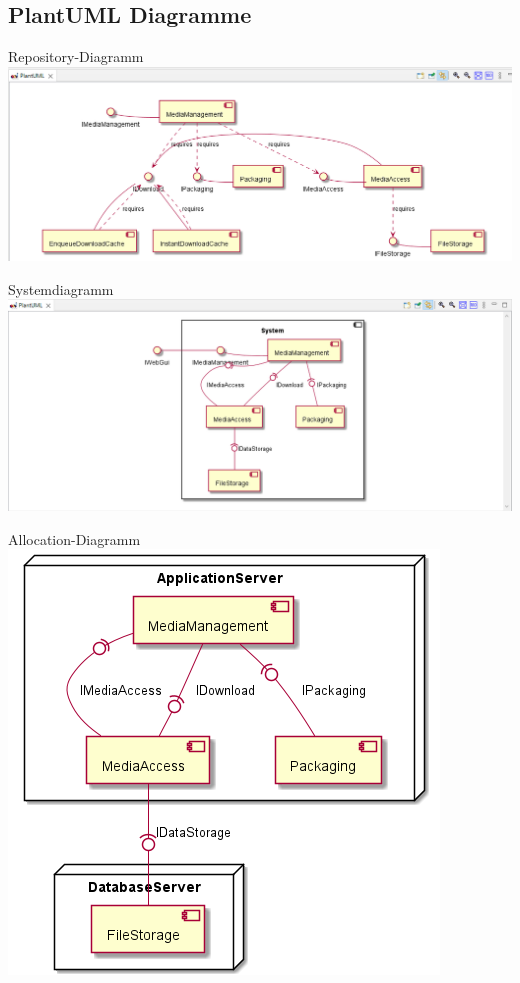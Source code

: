 \documentclass{sdqbeamer}
\begin{document}
\subsection{PlantUML Diagramme}
\begin{frame}{Repository-Diagramm}
\includegraphics[width=\textwidth]{repository.png}
\end{frame}
\begin{frame}{Systemdiagramm}
\centering
\includegraphics[height=.8\textheight]{system.png}
\end{frame}
\begin{frame}{Allocation-Diagramm}
\centering
\includegraphics[height=.8\textheight]{allocation.png}
\end{frame}
\end{document}

